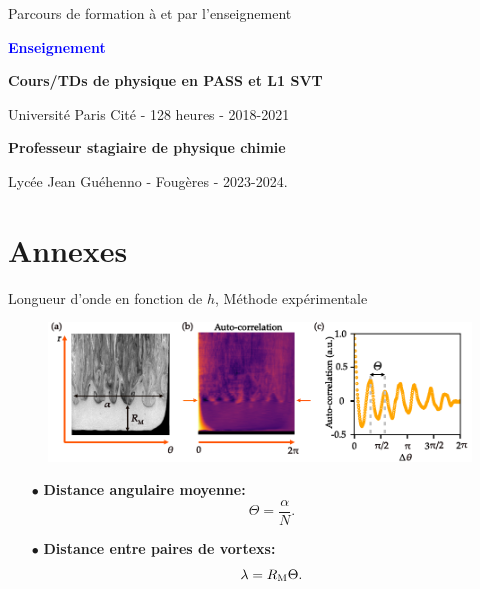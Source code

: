 \documentclass[aspectratio=169,10pt]{beamer}
\begin{document}
\begin{frame}{Parcours de formation à et par l'enseignement}
\begin{minipage}{.35\linewidth}
  
  \textbf{\textcolor{blue}{Enseignement}}\smallskip
  
  \textbf{Cours/TDs de physique en PASS et L1 SVT}\smallskip
  
Université Paris Cité - 128 heures - 2018-2021 \smallskip

\textbf{Professeur stagiaire de physique chimie}\smallskip
  
Lycée Jean Guéhenno - Fougères - 2023-2024.

  \end{minipage}
\end{frame}
\section{Annexes}


\begin{frame}{Longueur d'onde en fonction de $h$, Méthode expérimentale}
  \begin{figure}
      \centering
      \includegraphics[scale=.85]{./figures/Methode_analyse_lambda.pdf}
  \end{figure}

  \begin{ombredef}
      \begin{defi}
          \begin{multicols}{2}
          \begin{itemize}
              \item[$\bullet$]{\textbf{Distance angulaire moyenne:}}
                \begin{equation}
                  \Theta = \frac{\alpha}{N}.
                  \label{eq:Theta}
                \end{equation}
              \item[$\bullet$] {\textbf{Distance entre paires de vortexs:}}
                \begin{equation}
                  \lambda = R_{\rm M}\Theta.
                  \label{eq:lambda}
                \end{equation}
              \end{itemize}
          \end{multicols}
      \end{defi}
  \end{ombredef}
\end{frame}
\end{document}
